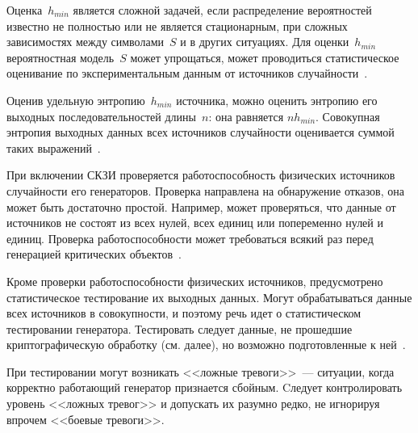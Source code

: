 Оценка~$h_{min}$ является сложной задачей, если распределение вероятностей 
известно не полностью или не является стационарным,
при сложных зависимостях между символами~$S$ и в других ситуациях.
%
Для оценки~$h_{min}$ вероятностная модель~$S$ может упрощаться,
может проводиться статистическое оценивание по экспериментальным
данным от источников случайности~.

Оценив удельную энтропию~$h_{min}$ источника, можно оценить 
энтропию его выходных последовательностей длины~$n$: она равняется 
$n h_{min}$. Совокупная энтропия выходных данных всех источников 
случайности оценивается суммой таких выражений~.

При включении СКЗИ проверяется работоспособность физических источников 
случайности его генераторов. Проверка направлена на обнаружение отказов, она 
может быть достаточно простой. Например, может проверяться, что данные от 
источников не состоят из всех нулей, всех единиц или попеременно нулей и 
единиц.
%
Проверка работоспособности может требоваться всякий раз перед генерацией 
критических объектов~.

Кроме проверки работоспособности физических источников, предусмотрено 
статистическое тестирование их выходных данных. Могут обрабатываться
данные всех источников в совокупности, и поэтому речь идет о статистическом 
тестировании генератора.
%
Тестировать следует данные, не прошедшие криптографическую обработку 
(см. далее), но возможно подготовленные к ней~.

При тестировании могут возникать <<ложные тревоги>>~--- ситуации, когда 
корректно работающий генератор признается сбойным. 
% 
Cледует контролировать уровень <<ложных тревог>> и допускать их разумно 
редко, не игнорируя впрочем <<боевые тревоги>>. 
%
%

